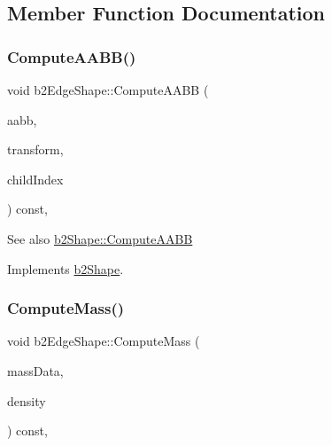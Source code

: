 \subsection{Member Function Documentation}
\mbox{\label{classb2_edge_shape_a238139ae1736b457d77443133ff16854}} 
\subsubsection{\texorpdfstring{Compute\+A\+A\+B\+B()}{ComputeAABB()}}
{\footnotesize\ttfamily void b2\+Edge\+Shape\+::\+Compute\+A\+A\+BB (\begin{DoxyParamCaption}\item[{\hyperlink{structb2_a_a_b_b}{b2\+A\+A\+BB} $\ast$}]{aabb,  }\item[{const \hyperlink{structb2_transform}{b2\+Transform} \&}]{transform,  }\item[{int32}]{child\+Index }\end{DoxyParamCaption}) const\hspace{0.3cm}{\ttfamily [override]}, {\ttfamily [virtual]}}

\begin{DoxySeeAlso}{See also}
\hyperlink{classb2_shape_a88e9807fab0c8ca9a98d8926e50a1411}{b2\+Shape\+::\+Compute\+A\+A\+BB} 
\end{DoxySeeAlso}


Implements \hyperlink{classb2_shape_a88e9807fab0c8ca9a98d8926e50a1411}{b2\+Shape}.

\mbox{\label{classb2_edge_shape_ac738c1e0ab2f4dfbab26e3942efa60af}} 
\subsubsection{\texorpdfstring{Compute\+Mass()}{ComputeMass()}}
{\footnotesize\ttfamily void b2\+Edge\+Shape\+::\+Compute\+Mass (\begin{DoxyParamCaption}\item[{\hyperlink{structb2_mass_data}{b2\+Mass\+Data} $\ast$}]{mass\+Data,  }\item[{float32}]{density }\end{DoxyParamCaption}) const\hspace{0.3cm}{\ttfamily [override]}, {\ttfamily [virtual]}}

